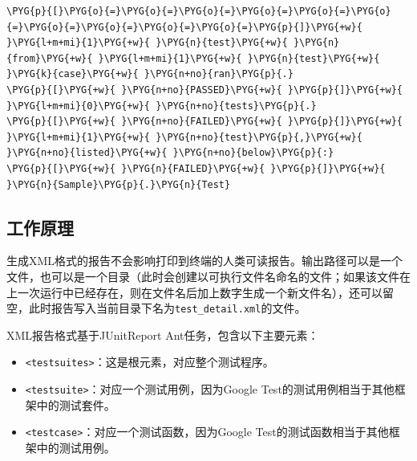 \begin{itemize}
\begin{codeblockbg}
\begin{Verbatim}[commandchars=\\\{\},breaklines=true,breakanywhere=true,fontsize=\codefont,xleftmargin=17bp]
\PYG{p}{[}\PYG{o}{=}\PYG{o}{=}\PYG{o}{=}\PYG{o}{=}\PYG{o}{=}\PYG{o}{=}\PYG{o}{=}\PYG{o}{=}\PYG{o}{=}\PYG{o}{=}\PYG{p}{]}\PYG{+w}{ }\PYG{l+m+mi}{1}\PYG{+w}{ }\PYG{n}{test}\PYG{+w}{ }\PYG{n}{from}\PYG{+w}{ }\PYG{l+m+mi}{1}\PYG{+w}{ }\PYG{n}{test}\PYG{+w}{ }\PYG{k}{case}\PYG{+w}{ }\PYG{n+no}{ran}\PYG{p}{.}
\PYG{p}{[}\PYG{+w}{ }\PYG{n+no}{PASSED}\PYG{+w}{ }\PYG{p}{]}\PYG{+w}{ }\PYG{l+m+mi}{0}\PYG{+w}{ }\PYG{n+no}{tests}\PYG{p}{.}
\PYG{p}{[}\PYG{+w}{ }\PYG{n+no}{FAILED}\PYG{+w}{ }\PYG{p}{]}\PYG{+w}{ }\PYG{l+m+mi}{1}\PYG{+w}{ }\PYG{n+no}{test}\PYG{p}{,}\PYG{+w}{ }\PYG{n+no}{listed}\PYG{+w}{ }\PYG{n+no}{below}\PYG{p}{:}
\PYG{p}{[}\PYG{+w}{ }\PYG{n}{FAILED}\PYG{+w}{ }\PYG{p}{]}\PYG{+w}{ }\PYG{n}{Sample}\PYG{p}{.}\PYG{n}{Test}
\end{Verbatim}
\end{codeblockbg}

\end{itemize}



\subsection{工作原理}



生成XML格式的报告不会影响打印到终端的人类可读报告。输出路径可以是一个文件，也可以是一个目录（此时会创建以可执行文件名命名的文件；如果该文件在上一次运行中已经存在，则在文件名后加上数字生成一个新文件名），还可以留空，此时报告写入当前目录下名为\texttt{test\_\allowbreak{}detail.\allowbreak{}xml}的文件。



XML报告格式基于JUnitReport Ant任务，包含以下主要元素：



\begin{itemize}
\item \texttt{<\allowbreak{}testsuites>}：这是根元素，对应整个测试程序。



\item \texttt{<\allowbreak{}testsuite>}：对应一个测试用例，因为Google Test的测试用例相当于其他框架中的测试套件。



\item \texttt{<\allowbreak{}testcase>}：对应一个测试函数，因为Google Test的测试函数相当于其他框架中的测试用例。

\end{itemize}



